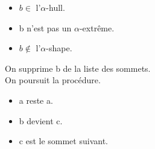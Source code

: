 \begin{frame}
\begin{columns}[t]
\begin{column}{3cm}
\begin{block}{}
{        }
        {
          \begin{itemize}
            \item $b \in$ l'$\alpha$-hull.
            \item b n'est pas un $\alpha$-extrême.
            \item $b \notin$ l'$\alpha$-shape.
          \end{itemize}
        }
        {
          On supprime b de la liste des sommets.\\
          On poursuit la procédure.\\
        }
        {
          \begin{itemize}
            \item a reste a.
            \item b devient c.
            \item c est le sommet suivant.
          \end{itemize}
        }
      \end{block}
    \end{column}
  \end{columns}
\end{frame}

